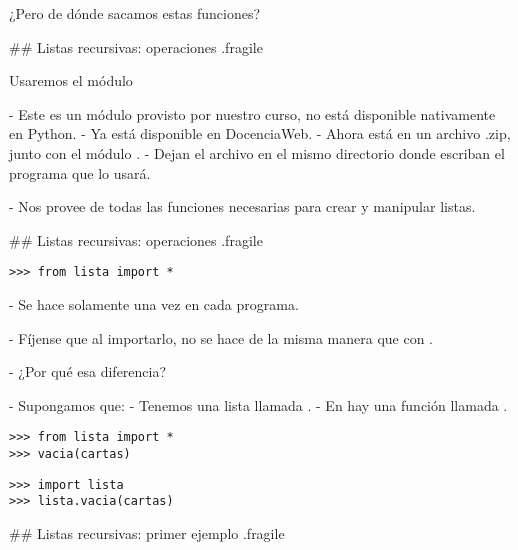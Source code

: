 \pause

\bgnblockdanger
¿Pero de dónde sacamos estas funciones?
\trmblockdanger

## Listas recursivas: operaciones {.fragile}

\bgnblockidea
Usaremos el módulo 
\trmblockidea

\pause

- Este es un módulo provisto por nuestro curso, no está disponible nativamente en Python.
- Ya está disponible en DocenciaWeb.
    - Ahora está en un archivo .zip, junto con el módulo .
- Dejan el archivo  en el mismo directorio donde escriban el programa que lo usará.

- Nos provee de todas las funciones necesarias para crear y manipular listas.

## Listas recursivas: operaciones {.fragile}


\begin{lstlisting}[style=frame02]
>>> from lista import *
\end{lstlisting}

- Se hace solamente una vez en cada programa.

- Fíjense que al importarlo, no se hace de la misma manera que con .

\pause

- ¿Por qué esa diferencia?

\pause

- Supongamos que:
    - Tenemos una lista llamada .
    - En  hay una función llamada .

\bgncolumns
{}

\begin{lstlisting}[style=frame02]
>>> from lista import *
>>> vacia(cartas)
\end{lstlisting}


\begin{lstlisting}[style=frame02]
>>> import lista
>>> lista.vacia(cartas)
\end{lstlisting}

\trmcolumns


## Listas recursivas: primer ejemplo {.fragile}


